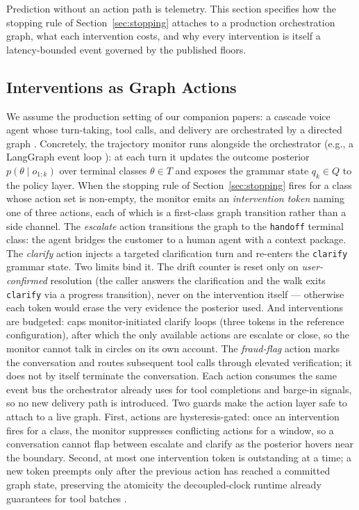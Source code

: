 Prediction without an action path is telemetry.
This section specifies how the stopping rule of Section~\ref{sec:stopping} attaches to a
production orchestration graph, what each intervention costs, and why every intervention is
itself a latency-bounded event governed by the published floors.

\subsection{Interventions as Graph Actions}
We assume the production setting of our companion papers: a cascade voice agent whose
turn-taking, tool calls, and delivery are orchestrated by a directed graph
\citep{garcia2026latencyfloor,garcia2026cessationfloor}.
Concretely, the trajectory monitor runs alongside the orchestrator
(e.g., a LangGraph event loop \citep{langgraph2024}): at each turn it updates the outcome posterior
$p(\theta \mid o_{1:k})$ over terminal classes $\theta \in T$
and exposes the grammar state $q_k \in Q$ to the policy layer.
When the stopping rule of Section~\ref{sec:stopping} fires for a class whose action set is
non-empty, the monitor emits an \emph{intervention token} naming one of three actions,
each of which is a first-class graph transition rather than a side channel.
The \emph{escalate} action transitions the graph to the \texttt{handoff} terminal class:
the agent bridges the customer to a human agent with a context package.
The \emph{clarify} action injects a targeted clarification turn and re-enters the
\texttt{clarify} grammar state.
Two limits bind it.
The drift counter is reset only on \emph{user-confirmed} resolution (the caller answers the
clarification and the walk exits \texttt{clarify} via a progress transition), never on the
intervention itself --- otherwise each token would erase the very evidence the posterior used.
And interventions are budgeted: caps monitor-initiated clarify loops (three tokens in the reference configuration), after which the only available actions are escalate or
close, so the monitor cannot talk in circles on its own account.
The \emph{fraud-flag} action marks the conversation and routes subsequent tool calls through
elevated verification; it does not by itself terminate the conversation.
Each action consumes the same event bus the orchestrator already uses for tool completions
and barge-in signals, so no new delivery path is introduced.
Two guards make the action layer safe to attach to a live graph.
First, actions are hysteresis-gated:
once an intervention fires for a class, the monitor suppresses conflicting actions for a window,
so a conversation cannot flap between escalate and clarify as the posterior hovers near the boundary.
Second, at most one intervention token is outstanding at a time; a new token preempts only after the previous action has reached a committed graph state, preserving the atomicity the decoupled-clock runtime already guarantees for tool batches \citep{garcia2026cessationfloor}.


